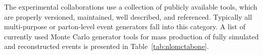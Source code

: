 
The experimental collaborations use a collection of publicly available tools, which are 
properly versioned, maintained, well described, and referenced.  Typically
all multi-purpose or parton-level event generators fall into this category.
A list of currently used Monte Carlo generator tools for mass production of 
fully simulated and reconstructed events is presented in Table~\ref{tab:nlomctabone}.


